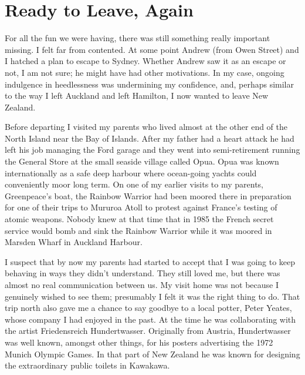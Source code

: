 \chapter{Ready to Leave, Again}

\vspace*{-0.5\baselineskip}

\enlargethispage{\baselineskip}

For all the fun we were having, there was still something really
important missing. I felt far from contented. At some point Andrew (from
Owen Street) and I hatched a plan to escape to Sydney. Whether Andrew
saw it as an escape or not, I am not sure; he might have had other
motivations. In my case, ongoing indulgence in heedlessness was
undermining my confidence, and, perhaps similar to the way I left
Auckland and left Hamilton, I now wanted to leave New Zealand.

Before departing I visited my parents who lived almost at the other end
of the North Island near the Bay of Islands. After my father had a heart
attack he had left his job managing the Ford garage and they went into
semi-retirement running the General Store at the small seaside village
called Opua. Opua was known internationally as a safe deep harbour where
ocean-going yachts could conveniently moor long term. On one of my
earlier visits to my parents, Greenpeace's boat, the \mbox{Rainbow} Warrior had been
moored there in preparation for one of their trips to Mururoa Atoll to
protest against France's testing of atomic weapons. Nobody knew at that
time that in 1985 the French secret service would bomb and sink the
Rainbow Warrior while it was moored in Marsden Wharf\cite{rainbow-warrior} in Auckland Harbour.

\enlargethispage{2\baselineskip}

I suspect that by now my parents had started to accept that I was going
to keep behaving in ways they didn't understand. They still loved me,
but there was almost no real communication between us. My visit home was
not because I genuinely wished to see them; presumably I felt it was the
right thing to do. That trip north also gave me a chance to say goodbye
to a local potter, Peter Yeates, whose company I had enjoyed in the
past. At the time he was collaborating with the artist Friedensreich
Hundertwasser. Originally from Austria, Hundertwasser was well known,
amongst other things, for his posters advertising the
1972 Munich Olympic Games\cite{olympic}.
In that part of New Zealand he was known for designing the extraordinary
public toilets in Kawakawa\cite{toilets}.

